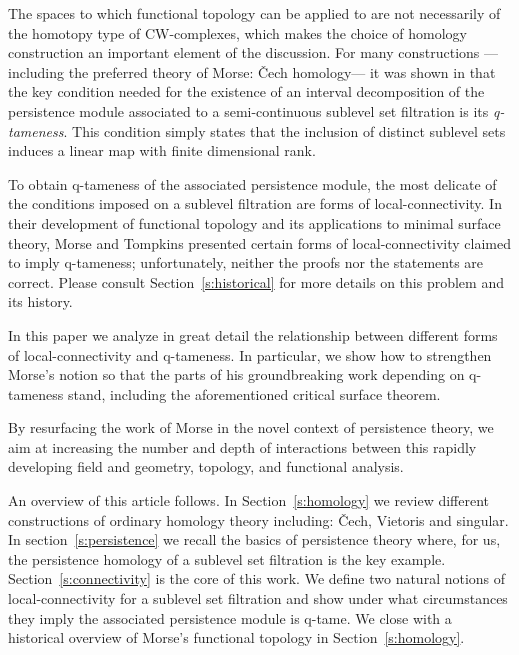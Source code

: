 The spaces to which functional topology can be applied to are not necessarily of the homotopy type of CW-complexes, which makes the choice of homology construction an important element of the discussion.
For many constructions ---including the preferred theory of Morse: \v{C}ech homology--- it was shown in \cite{schmahl2020structure} that the key condition needed for the existence of an interval decomposition of the persistence module associated to a semi-continuous sublevel set filtration is its \textit{q-tameness}.
This condition simply states that the inclusion of distinct sublevel sets induces a linear map with finite dimensional rank.

To obtain q-tameness of the associated persistence module, the most delicate of the conditions imposed on a sublevel filtration are forms of local-connectivity.
In their development of functional topology and its applications to minimal surface theory, Morse and Tompkins presented certain forms of local-connectivity claimed to imply q-tameness; unfortunately, neither the proofs nor the statements are correct.
Please consult Section~\ref{s:historical} for more details on this problem and its history.

In this paper we analyze in great detail the relationship between different forms of local-connectivity and q-tameness.
In particular, we show how to strengthen Morse's notion so that the parts of his groundbreaking work depending on q-tameness stand, including the aforementioned critical surface theorem.

By resurfacing the work of Morse in the novel context of persistence theory, we aim at increasing the number and depth of interactions between this rapidly developing field and geometry, topology, and functional analysis.

An overview of this article follows.
In Section~\ref{s:homology} we review different constructions of ordinary homology theory including: \v{C}ech, Vietoris and singular.
In section~\ref{s:persistence} we recall the basics of persistence theory where, for us, the persistence homology of a sublevel set filtration is the key example.
Section~\ref{s:connectivity} is the core of this work.
We define two natural notions of local-connectivity for a sublevel set filtration and show under what circumstances they imply the associated persistence module is q-tame.
We close with a historical overview of Morse's functional topology in Section~\ref{s:homology}.